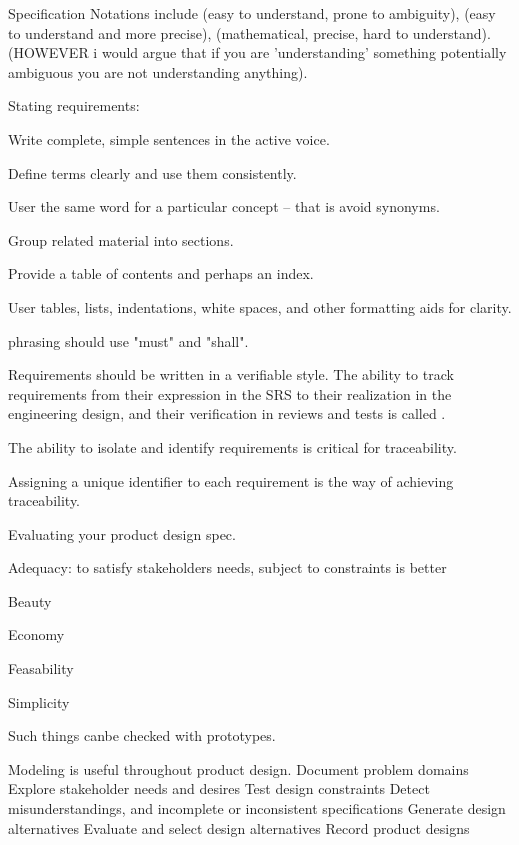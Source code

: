 \begin{compactitem}
\begin{compactitem}
\item Specification Notations include  (easy to understand, prone to ambiguity),  (easy to understand and more precise),  (mathematical, precise, hard to understand). (HOWEVER i would argue that if you are 'understanding' something potentially ambiguous you are not understanding anything). 

\item Stating requirements:
\begin{compactitem}
\item Write complete, simple sentences in the active voice.
\item Define terms clearly and use them consistently.
\item User the same word for a particular concept – that is avoid synonyms.
\item Group related material into sections.
\item Provide a table of contents and perhaps an index.
\item User tables, lists, indentations, white spaces, and other formatting aids for clarity.
\item phrasing should use "must" and "shall".
\item Requirements should be written in a verifiable style. The ability to track requirements from their expression in the SRS to their realization in the engineering design, and their verification in reviews and tests is called .
\item The ability to isolate and identify requirements is critical for traceability. 
\item Assigning a unique identifier to each requirement is the way of achieving traceability.
\end{compactitem}

\item Evaluating your product design spec.
\begin{compactitem}
\item Adequacy: to satisfy stakeholders needs, subject to constraints is better
\item Beauty
\item Economy
\item Feasability
\item Simplicity
\end{compactitem}
Such things canbe checked with prototypes.


Modeling is useful throughout product design.
Document problem domains
Explore stakeholder needs and desires
Test design constraints
Detect misunderstandings, and incomplete or inconsistent specifications
Generate design alternatives
Evaluate and select design alternatives
Record product designs



\end{compactitem}
\end{compactitem}

